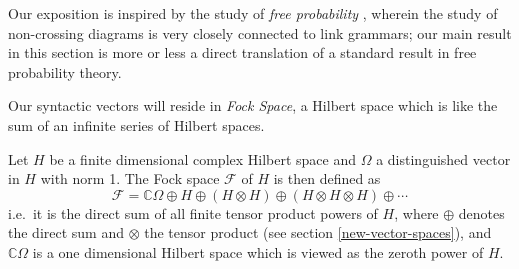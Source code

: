 



Our exposition is inspired by the study of \emph{free probability} \citep{Voiculescu:97}, wherein the study of non-crossing diagrams is very closely connected to link grammars; our main result in this section is more or less a direct translation of a standard result in free probability theory.

Our syntactic vectors will reside in \emph{Fock Space}, a Hilbert space which is like the sum of an infinite series of Hilbert spaces.


Let $H$ be a finite dimensional complex Hilbert space and $\Omega$ a distinguished vector in $H$ with norm 1. The Fock space $\mathcal{F}$ of $H$ is then defined as
$$\mathcal{F} = \mathbb{C}\Omega \oplus H \oplus (H \otimes H) \oplus (H \otimes H \otimes H) \oplus \cdots$$
i.e.~it is the direct sum of all finite tensor product powers of $H$, where $\oplus$ denotes the direct sum and $\otimes$ the tensor product (see section \ref{new-vector-spaces}), and $\mathbb{C}\Omega$ is a one dimensional Hilbert space which is viewed as the zeroth power of $H$.

